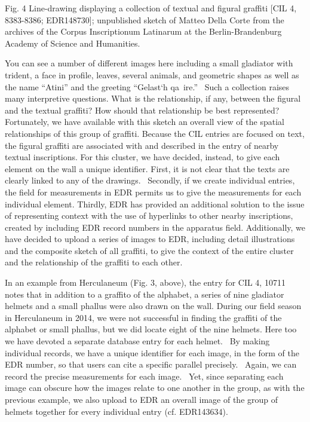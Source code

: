 \documentclass[amsthm,ebook]{saparticle}
\begin{document}
Fig. 4 Line-drawing displaying a collection of textual and figural graffiti [CIL 4, 8383-8386; EDR148730]; unpublished
sketch of Matteo Della Corte from the archives of the Corpus Inscriptionum Latinarum at the Berlin-Brandenburg Academy
of Science and Humanities.


\bigskip

You can see a number of different images here including a small gladiator with trident, a face in profile, leaves,
several animals, and geometric shapes as well as the name “Atini” and the greeting “\textgreek{Gelast`h qa~ire.”
}\ Such a collection raises many interpretive questions. What is the relationship, if any, between the figural and the
textual graffiti? How should that relationship be best represented? Fortunately, we have available with this sketch an
overall view of the spatial relationships of this group of graffiti. Because the CIL entries are focused on text, the
figural graffiti are associated with and described in the entry of nearby textual inscriptions. For this cluster, we
have decided, instead, to give each element on the wall a unique identifier. First, it is not clear that the texts are
clearly linked to any of the drawings. \ Secondly, if we create individual entries, the field for measurements in EDR
permits us to give the measurements for each individual element. Thirdly, EDR has provided an additional solution to
the issue of representing context with the use of hyperlinks to other nearby inscriptions, created by including EDR
record numbers in the apparatus field. Additionally, we have decided to upload a series of images to EDR, including
detail illustrations and the composite sketch of all graffiti, to give the context of the entire cluster and the
relationship of the graffiti to each other.

In an example from Herculaneum (Fig. 3, above), the entry for CIL 4, 10711 notes that in addition to a graffito of the
alphabet, a series of nine gladiator helmets and a small phallus were also drawn on the wall. During our field season
in Herculaneum in 2014, we were not successful in finding the graffiti of the alphabet or small phallus, but we did
locate eight of the nine helmets. Here too we have devoted a separate database entry for each helmet. \ By making
individual records, we have a unique identifier for each image, in the form of the EDR number, so that users can cite a
specific parallel precisely. \ Again, we can record the precise measurements for each image. \ Yet, since separating
each image can obscure how the images relate to one another in the group, as with the previous example, we also upload
to EDR an overall image of the group of helmets together for every individual entry (cf. EDR143634).
\end{document}
